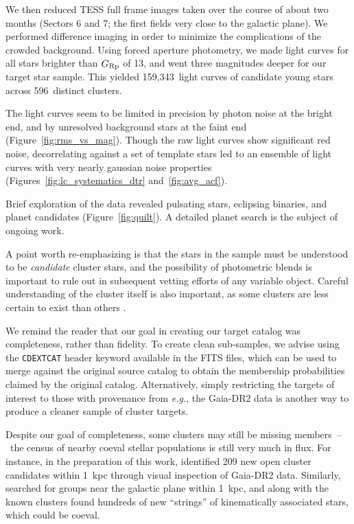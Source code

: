 \documentclass[12pt,twocolumn,tighten]{aastex62}
\newcommand{\numberlcs}{159{,}343\ } %
\newcommand{\numberclusters}{596\ } %
\begin{document}
We then reduced TESS full frame images taken over the course of about
two months (Sectors 6 and 7; the first fields very close to the
galactic plane).  We performed difference imaging in order to minimize
the complications of the crowded background.  Using forced aperture
photometry, we made light curves for all stars brighter than $G_{\rm
Rp}$ of 13, and went three magnitudes deeper for our target star
sample.  This yielded \numberlcs light curves of candidate young stars
across \numberclusters distinct clusters.

The light curves seem to be limited in precision by photon noise at
the bright end, and by unresolved background stars at the faint end
(Figure~\ref{fig:rms_vs_mag}).
Though the raw light curves show significant red noise, decorrelating
against a set of template stars led to an ensemble of light curves
with very nearly gaussian noise properties 
(Figures~\ref{fig:lc_systematics_dtr} and~\ref{fig:avg_acf}).

Brief exploration of the data revealed pulsating stars, eclipsing
binaries, and planet candidates (Figure~\ref{fig:quilt}).  A detailed planet 
search is the
subject of ongoing work.

A point worth re-emphasizing is that the stars in the
sample must be understood to be {\it candidate} cluster stars, and the
possibility of photometric blends is important to rule out in
subsequent vetting efforts of any variable object.  Careful
understanding of the cluster itself is also important, as some
clusters are less certain to exist than others \citep[{\it
e.g.}, the infra-red clusters identified by][]{froebrich_FSR_2007}.

We remind the reader that our goal in creating our target catalog was
completeness, rather than fidelity.  To create clean sub-samples, we
advise using the \texttt{CDEXTCAT} header keyword available in the
FITS files, which can be used to merge against the original source
catalog to obtain the membership probabilities claimed by the original
catalog.  Alternatively, simply restricting the targets of interest to
those with provenance from {\it e.g.}, the Gaia-DR2 data is another
way to produce a cleaner sample of cluster targets.

Despite our goal of completeness, some clusters may still be missing
members~--~the census of nearby coeval stellar populations is still
very much in flux. For instance, in the preparation of this work,
\citet{sim_open_2019} identified 209 new open cluster candidates
within 1~kpc through visual inspection of Gaia-DR2 data.  Similarly,
\citet{kounkel_untangling_2019} searched for groups near
the galactic plane within 1~kpc, and along with the known clusters
found hundreds of new ``strings'' of kinematically associated stars, which
could be coeval.
\end{document}
